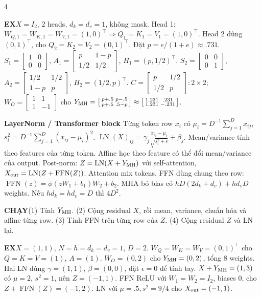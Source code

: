 \documentclass[a4paper]{article}
\newcommand{\run}[1]{\key{CHẠY}#1}
\newcommand{\key}[1]{\par\textcolor{structure}{\textbf{#1}}\enspace}
\newcommand{\note}[4]{\par\begingroup\setlength{\fboxsep}{0.15pt}%
  \noindent\colorbox{#1}{\parbox{\dimexpr\linewidth-2\fboxsep\relax}{%
    \RaggedRight\textcolor{#2}{\textbf{#3}}\enspace #4}}%
  \endgroup\par}
\newcommand{\ex}[1]{\note{examplebg}{example}{EX}{#1}}
\begin{document}
\begin{multicols*}{4}
\ex{$X=I_2$, 2 heads, $d_k=d_v=1$, không mask. Head 1: $W_{Q,1}=W_{K,1}=W_{V,1}=(1,0)^\top\Rightarrow Q_1=K_1=V_1=(1,0)^\top$. Head 2 dùng $(0,1)^\top$, cho $Q_2=K_2=V_2=(0,1)^\top$. Đặt $p=e/(1+e)\approx.731$. $S_1=\left[\begin{smallmatrix}1&0\\0&0\end{smallmatrix}\right]$, $A_1=\left[\begin{smallmatrix}p&1-p\\1/2&1/2\end{smallmatrix}\right]$, $H_1=(p,1/2)^\top$. $S_2=\left[\begin{smallmatrix}0&0\\0&1\end{smallmatrix}\right]$, $A_2=\left[\begin{smallmatrix}1/2&1/2\\1-p&p\end{smallmatrix}\right]$, $H_2=(1/2,p)^\top$. $C=\left[\begin{smallmatrix}p&1/2\\1/2&p\end{smallmatrix}\right]:2\times2$; $W_O=\left[\begin{smallmatrix}1&1\\1&-1\end{smallmatrix}\right]$ cho $Y_{\rm MH}=\left[\begin{smallmatrix}p+.5&p-.5\\p+.5&.5-p\end{smallmatrix}\right]\approx\left[\begin{smallmatrix}1.231&.231\\1.231&-.231\end{smallmatrix}\right]$.}

\key{LayerNorm / Transformer block}
Từng token row $x_i$ có $\mu_i=D^{-1}\sum_{j=1}^D x_{ij}$, $s_i^2=D^{-1}\sum_{j=1}^D(x_{ij}-\mu_i)^2$.
$\operatorname{LN}(X)_{ij}=\gamma_j\frac{x_{ij}-\mu_i}{\sqrt{s_i^2+\epsilon}}+\beta_j$.
Mean/variance tính theo features của từng token. Affine học theo feature có thể đổi mean/variance của output.
Post-norm: $Z=\operatorname{LN}(X+Y_{\rm MH})$ với self-attention, $X_{\rm out}=\operatorname{LN}(Z+\operatorname{FFN}(Z))$.
Attention mix tokens. FFN dùng chung theo row: $\operatorname{FFN}(z)=\phi(z W_1+b_1)W_2+b_2$.
MHA bỏ bias có $hD(2d_k+d_v)+hd_vD$ weights. Nếu $hd_k=hd_v=D$ thì $4D^2$.
\run{(1) Tính $Y_{\rm MH}$. (2) Cộng residual $X$, rồi mean, variance, chuẩn hóa và affine từng row. (3) Tính FFN trên từng row của $Z$. (4) Cộng residual $Z$ và LN lại.}
\ex{$X=(1,1)$, $N=h=d_k=d_v=1$, $D=2$. $W_Q=W_K=W_V=(0,1)^\top$ cho $Q=K=V=(1)$, $A=(1)$. $W_O=(0,2)$ cho $Y_{\rm MH}=(0,2)$, tổng $8$ weights. Hai LN dùng $\gamma=(1,1)$, $\beta=(0,0)$, đặt $\epsilon=0$ để tính tay. $X+Y_{\rm MH}=(1,3)$ có $\mu=2$, $s^2=1$, nên $Z=(-1,1)$. FFN ReLU với $W_1=W_2=I_2$, biases $0$, cho $Z+\operatorname{FFN}(Z)=(-1,2)$. LN với $\mu=.5,s^2=9/4$ cho $X_{\rm out}=(-1,1)$.}


\end{multicols*}
\end{document}
